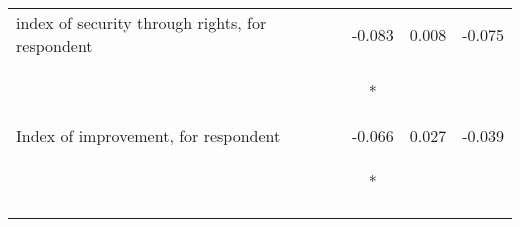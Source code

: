 \begin{tabular}{lcccccc}
\noalign{\smallskip}index of security through rights, for respondent &  &  &  & -0.083 & 0.008 & -0.075\\
 & \begin{footnotesize}\end{footnotesize} & \begin{footnotesize}\end{footnotesize} & \begin{footnotesize}\end{footnotesize} & \begin{footnotesize}[0.044]*\end{footnotesize} & \begin{footnotesize}[0.064]\end{footnotesize} & \begin{footnotesize}[0.054]\end{footnotesize}\\
\noalign{\smallskip}Index of improvement, for respondent &  &  &  & -0.066 & 0.027 & -0.039\\
 & \begin{footnotesize}\end{footnotesize} & \begin{footnotesize}\end{footnotesize} & \begin{footnotesize}\end{footnotesize} & \begin{footnotesize}[0.039]*\end{footnotesize} & \begin{footnotesize}[0.061]\end{footnotesize} & \begin{footnotesize}[0.056]\end{footnotesize}\\
\noalign{\smallskip}\hline\end{tabular}
